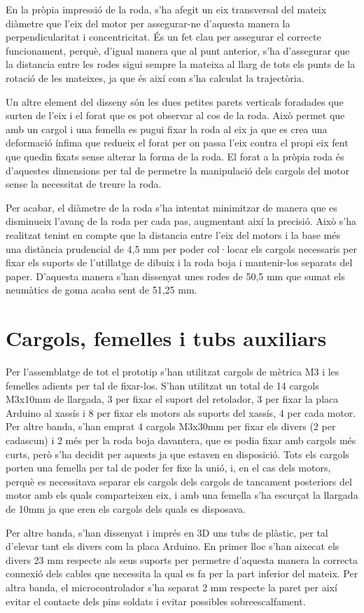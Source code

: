 En la pròpia impressió de la roda, s’ha afegit un eix transversal del mateix diàmetre que l’eix del motor per assegurar-ne d’aquesta manera la perpendicularitat i concentricitat. És un fet clau per assegurar el correcte funcionament, perquè, d’igual manera que al punt anterior, s’ha d’assegurar que la distancia entre les rodes sigui sempre la mateixa al llarg de tots els punts de la rotació de les mateixes, ja que és així com s’ha calculat la trajectòria. 

Un altre element del disseny són les dues petites parets verticals foradades que surten de l’eix i el forat que es pot observar al cos de la roda. Això permet que amb un cargol i una femella es pugui fixar la roda al eix ja que es crea una deformació ínfima que redueix el forat per on passa l’eix contra el propi eix fent que quedin fixats sense alterar la forma de la roda. El forat a la pròpia roda és d’aquestes dimensions per tal de permetre la manipulació dels cargols del motor sense la necessitat de treure la roda. 

Per acabar, el diàmetre de la roda s’ha intentat minimitzar de manera que es disminueix l’avanç de la roda per cada pas, augmentant així la precisió. Això s’ha realitzat tenint en compte que la distancia entre l’eix del motors i la base més una distància prudencial de 4,5 mm per poder col·locar els cargols necessaris per fixar els suports de l’utillatge de dibuix i la roda boja i mantenir-los separats del paper. D’aquesta manera s’han dissenyat unes rodes de 50,5 mm que sumat els neumàtics de goma acaba sent de 51,25 mm. 

\section{Cargols, femelles i tubs auxiliars}

Per l’assemblatge de tot el prototip s’han utilitzat cargols de mètrica M3 i les femelles adients per tal de fixar-los. S’han utilitzat un total de 14 cargols M3x10mm de llargada, 3 per fixar el suport del retolador, 3 per fixar la placa Arduino al xassís i 8 per fixar els motors als suports del xassís, 4 per cada motor. Per altre banda, s’han emprat 4 cargols M3x30mm per fixar els divers (2 per cadascun) i 2 més per la roda boja davantera, que es podia fixar amb cargols més curts, però s’ha decidit per aquests ja que estaven en disposició. Tots els cargols porten una femella per tal de poder fer fixe la unió, i, en el cas dels motors, perquè es necessitava separar els cargols dels cargols de tancament posteriors del motor amb els quals comparteixen eix, i amb una femella s’ha escurçat la llargada de 10mm ja que eren els cargols dels quals es disposava. 

Per altre banda, s'han dissenyat i imprés en 3D uns tubs de plàstic, per tal d’elevar tant els divers com la placa Arduino. En primer lloc s’han aixecat els divers 23 mm respecte als seus suports per permetre d’aquesta manera la correcta connexió dels cables que necessita la qual es fa per la part inferior del mateix. Per altra banda, el microcontrolador s’ha separat 2 mm respecte la paret per així evitar el contacte dels pins soldats i evitar possibles sobreescalfament. 

